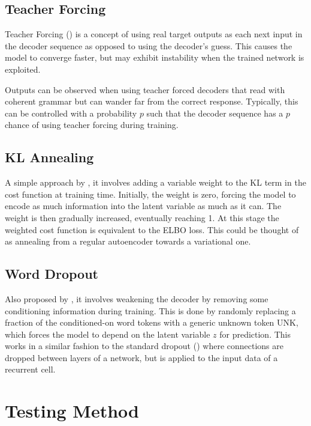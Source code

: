 \documentclass[12pt,twoside]{report}
\begin{document}
\subsection{Teacher Forcing}

Teacher Forcing (\cite{williams_learning_1989}) is a concept of using real target outputs as each next input in the decoder sequence as opposed to using the decoder's guess. This causes the model to converge faster, but may exhibit instability when the trained network is exploited.

Outputs can be observed when using teacher forced decoders that read with coherent grammar but can wander far from the correct response. Typically, this can be controlled with a probability $p$ such that the decoder sequence has a $p$ chance of using teacher forcing during training.

\subsection{KL Annealing}

A simple approach by \cite{bowman_generating_2015}, it involves adding a variable weight to the KL term in the cost function at training time. Initially, the weight is zero, forcing the model to encode as much information into the latent variable as much as it can. The weight is then gradually increased, eventually reaching 1. At this stage the weighted cost function is equivalent to the ELBO loss. This could be thought of as annealing from a regular autoencoder towards a variational one.

\subsection{Word Dropout}
Also proposed by \cite{bowman_generating_2015}, it involves weakening the decoder by removing some conditioning information during training. This is done by randomly replacing a fraction of the conditioned-on word tokens with a generic unknown token UNK, which forces the model to depend on the latent variable $z$ for prediction. This works in a similar fashion to the standard dropout (\cite{srivastava_dropout:_2014}) where connections are dropped between layers of a network, but is applied to the input data of a recurrent cell.

\section{Testing Method}
\end{document}
